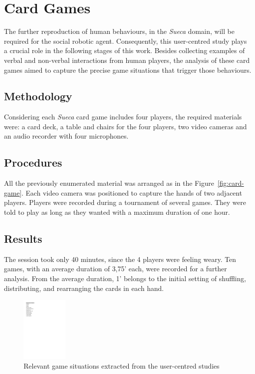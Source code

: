 \section{Card Games}
The further reproduction of human behaviours, in the \emph{Sueca} domain, will be required for the social robotic agent.
Consequently, this user-centred study plays a crucial role in the following stages of this work.
Besides collecting examples of verbal and non-verbal interactions from human players, the analysis of these card games aimed to capture the precise game situations that trigger those behaviours.



\subsection{Methodology}
Considering each \emph{Sueca} card game includes four players, the required materials were: a card deck, a table and chairs for the four players, two video cameras and an audio recorder with four microphones.

\subsection{Procedures}
All the previously enumerated material was arranged as in the Figure~\ref{fig:card-game}.
Each video camera was positioned to capture the hands of two adjacent players.
Players were recorded during a tournament of several games.
They were told to play as long as they wanted with a maximum duration of one hour.

\subsection{Results}
The session took only 40 minutes, since the 4 players were feeling weary.
Ten games, with an average duration of 3,75' each, were recorded for a further analysis.
From the average duration, 1' belongs to the initial setting of shuffling, distributing, and rearranging the cards in each hand.

\begin{figure}[h]
  \centering
    \includegraphics[width=0.2\textwidth]{./img/5/gameSituations}
  \caption{Relevant game situations extracted from the user-centred studies}
\label{fig:gameSituations}
\end{figure}

